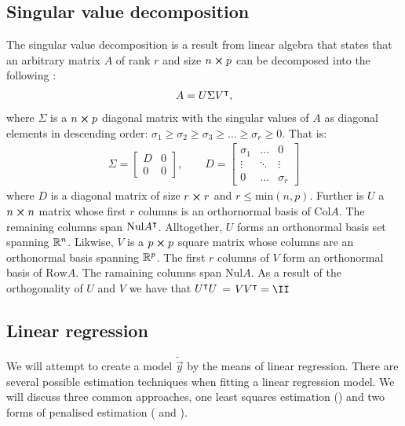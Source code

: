 \subsection{Singular value decomposition}\label{sec:SVD}
    The singular value decomposition is a result from linear algebra that states that an arbitrary matrix $A$ of rank $r$ and size $n\cross p$ can be decomposed into the following \citep{svdecomp}:
    \begin{align}\label{eq:svd}
        A = U\Sigma V\TT,
    \end{align}
    where $\Sigma$ is a $n\cross p$ diagonal matrix with the singular values of $A$ as diagonal elements in descending order: $\sigma_1\geq\sigma_2\geq\sigma_3\geq\dots\geq\sigma_r\geq 0$. That is:
    \begin{align*}
        \Sigma = 
        \begin{bmatrix}
            D & 0 \\
            0 & 0
        \end{bmatrix},
        \quad\quad D = 
        \begin{bmatrix}
            \sigma_1 & \dots & 0 \\
            \vdots & \ddots & \vdots \\
            0 & \dots & \sigma_r
        \end{bmatrix}
    \end{align*}
    where $D$ is a diagonal matrix of size $r\cross r$ and $r\leq \text{min}(n,p)$. Further is $U$ a $n\cross n$ matrix whose first $r$ columns is an orthornormal basis of $\text{Col}A$. The remaining columns span $\text{Nul}A\TT$. Alltogether, $U$ forms an orthonormal basis set spanning $\RR[n]$. Likwise, $V$ is a $p\cross p$ square matrix whose columns are an orthonormal basis spanning $\RR[p]$. The first $r$ columns of $V$ form an orthonormal basis of $\text{Row} A$. The ramaining columns span $\text{Nul}A$. As a result of the orthogonality of $U$ and $V$ we have that $U\TT U$ = $VV\TT = \II$

\subsection{Linear regression}\label{sec:regression}
We will attempt to create a model $\tilde{\vec{y}}$ by the means of linear regression. 
There are several possible estimation techniques when fitting a linear regression model. We will discuss three common approaches, one least squares estimation () and two forms of penalised estimation ( and ).

